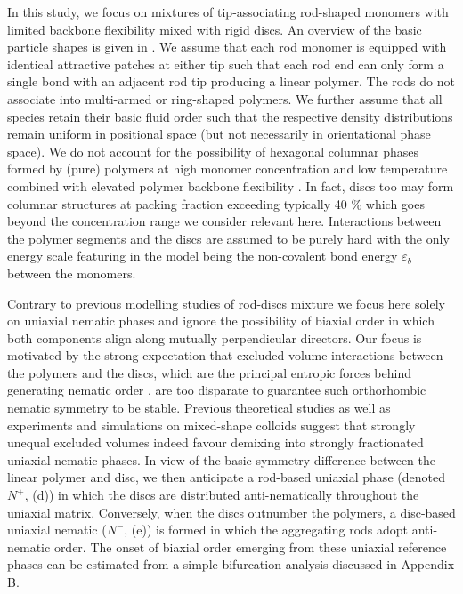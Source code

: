 In this study, we focus on mixtures of tip-associating rod-shaped monomers with limited backbone flexibility  mixed with rigid discs. An overview of the basic particle shapes is given in . We assume that each rod monomer is equipped with identical attractive patches at either tip such that each rod end can only form a single bond  with an adjacent rod tip producing a linear polymer. The rods do not associate into multi-armed or ring-shaped polymers. We further assume that all species retain their basic fluid order such that the respective density distributions remain uniform in positional space (but not necessarily in orientational phase space). We do not account for the possibility of hexagonal columnar phases formed by (pure) polymers at high monomer concentration and low temperature combined with elevated polymer backbone flexibility  \cite{taylorherzfeld1991,schoot1996}. In fact, discs too may form columnar structures at packing fraction exceeding typically 40 \% \cite{frenkelcol1989,veerman1992,kooij_nature2000} which goes beyond the concentration range we consider relevant here.  Interactions between the polymer segments and the discs are assumed to be purely hard with the only energy scale featuring in the model being the non-covalent bond energy $\varepsilon_{b}$ between the monomers.

 Contrary to previous modelling studies of rod-discs mixture we focus here solely on uniaxial nematic phases and ignore the possibility of biaxial order in which both components align along mutually perpendicular directors. Our focus is motivated by the strong expectation that excluded-volume interactions between the polymers and the discs, which are the principal entropic forces behind generating nematic order \cite{onsager1949}, are too disparate to guarantee such orthorhombic nematic symmetry to be stable. Previous theoretical studies \cite{jacksonbiaxrev,varga2002,jacksonbiax,wensinkrodplate,wensinkbiaxial} as well as experiments \cite{kooijlangmuir2000,kooijprl2000,woolston2015} and simulations \cite{campallenbolhuisfrenkel,galindo1,galindo2} on mixed-shape colloids  suggest that strongly unequal excluded volumes indeed favour demixing into strongly fractionated uniaxial nematic phases.  In view of the basic symmetry difference  between the linear polymer and disc, we  then anticipate a rod-based uniaxial phase (denoted $N^{+}$,  (d)) in which the discs are distributed  anti-nematically throughout the uniaxial matrix. Conversely, when the discs outnumber the polymers,  a disc-based uniaxial nematic ($N^{-}$,   (e)) is formed in which the aggregating rods adopt anti-nematic order. The onset of biaxial order emerging from these uniaxial reference phases can be estimated from a simple bifurcation analysis discussed in Appendix B.
 
